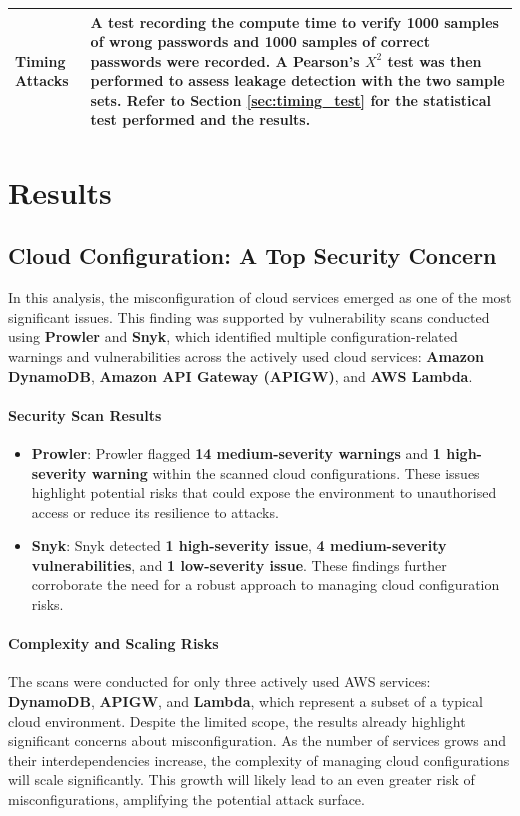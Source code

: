 \begin{longtable}{|p{5cm}|p{10cm}|}
\hline
Timing Attacks & A test recording the compute time to verify 1000 samples of wrong passwords and 1000 samples of correct passwords were recorded. A Pearson’s $X^{2}$ test was then performed to assess leakage detection with the two sample sets. Refer to Section \ref{sec:timing_test} for the statistical test performed and the results.\\
\hline
\end{longtable}

\section{Results} 

\subsection{Cloud Configuration: A Top Security Concern}

In this analysis, the misconfiguration of cloud services emerged as one of the most significant issues. This finding was supported by vulnerability scans conducted using \textbf{Prowler} and \textbf{Snyk}, which identified multiple configuration-related warnings and vulnerabilities across the actively used cloud services: \textbf{Amazon DynamoDB}, \textbf{Amazon API Gateway (APIGW)}, and \textbf{AWS Lambda}.

\paragraph{Security Scan Results}
\begin{itemize}
    \item \textbf{Prowler}: Prowler flagged \textbf{14 medium-severity warnings} and \textbf{1 high-severity warning} within the scanned cloud configurations. These issues highlight potential risks that could expose the environment to unauthorised access or reduce its resilience to attacks.
    \item \textbf{Snyk}: Snyk detected \textbf{1 high-severity issue}, \textbf{4 medium-severity vulnerabilities}, and \textbf{1 low-severity issue}. These findings further corroborate the need for a robust approach to managing cloud configuration risks.
\end{itemize}

\paragraph{Complexity and Scaling Risks}
The scans were conducted for only three actively used AWS services: \textbf{DynamoDB}, \textbf{APIGW}, and \textbf{Lambda}, which represent a subset of a typical cloud environment. Despite the limited scope, the results already highlight significant concerns about misconfiguration. As the number of services grows and their interdependencies increase, the complexity of managing cloud configurations will scale significantly. This growth will likely lead to an even greater risk of misconfigurations, amplifying the potential attack surface.

